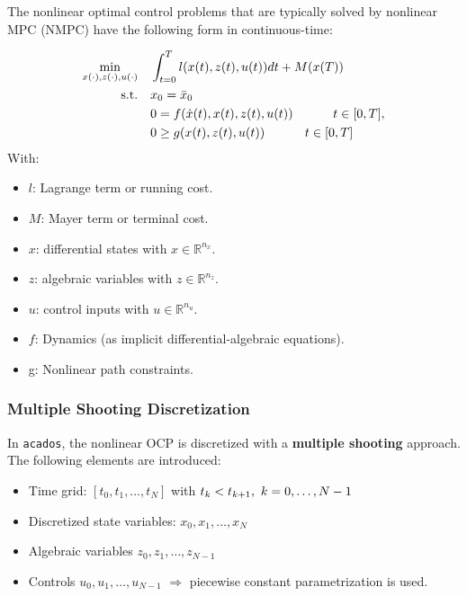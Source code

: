 \documentclass{thesisreport}
\begin{document}
The nonlinear optimal control problems that are typically solved by nonlinear MPC (NMPC) have the following form in continuous-time:

\begin{equation}\label{ocp_continuous_form}
        \begin{aligned}
        \min_{x(\cdot),z(\cdot),u(\cdot)} \quad & \int_{t=0}^{T}{l(x(t), z(t), u(t))dt + M(x(T))}\\
        \textrm{s.t.} \quad & x_0 = \bar{x}_0 \\
            & 0 = f(\dot{x}(t), x(t), z(t), u(t)) \text{\hspace{1cm} }t \in [0,T], \\
            & 0 \geq g(x(t), z(t), u(t)) \text{\hspace{1cm} } t \in [0,T] \\
        \end{aligned}
    \end{equation}
    With: 
    \begin{itemize}
		\item $l$: Lagrange term or running cost.
		\item $M$: Mayer term or terminal cost.        
        \item $x$: differential states with $x \in \mathbb{R}^{n_x}$.
        \item $z$: algebraic variables with $z \in \mathbb{R}^{n_z}$.
        \item $u$: control inputs with $u \in \mathbb{R}^{n_u}$.
        \item $f$: Dynamics (as implicit differential-algebraic equations).
        \item g: Nonlinear path constraints.
    \end{itemize} 
 
\subsubsection{Multiple Shooting Discretization}
In \texttt{acados}, the nonlinear OCP is discretized with a \textbf{multiple shooting} approach. The following elements are introduced:
    \begin{itemize}
        \item Time grid: $[t_0, t_1, \ldots, t_N]$ with $t_k < t_{k+1},\text{\space} k = 0, \ldots, N-1$
        \item Discretized state variables: $x_0, x_1, \ldots, x_N$
        \item Algebraic variables $z_0, z_1, \ldots, z_{N-1}$
        \item Controls $u_0, u_1, \ldots, u_{N-1}$ $\Rightarrow$ piecewise constant parametrization is used.    
    \end{itemize}    
\end{document}
